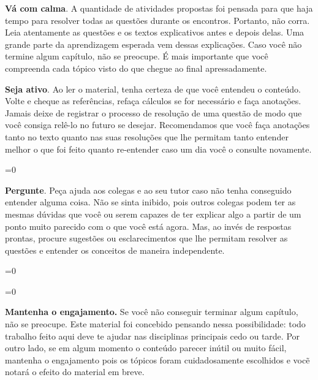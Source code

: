 {%

\textbf{Vá com calma}. A quantidade de atividades propostas foi pensada para que haja tempo para resolver todas as questões durante os encontros. Portanto, não corra. Leia atentamente as questões e os textos explicativos antes e depois delas. Uma grande parte da aprendizagem esperada vem dessas explicações. Caso você não termine algum capítulo, não se preocupe. É mais importante que você compreenda cada tópico visto do que chegue ao final apressadamente.


\paraAmbos
 
 \textbf{Seja ativo}. Ao ler o material, tenha certeza de que você entendeu o conteúdo. Volte e cheque as referências, refaça cálculos se for necessário e faça anotações. Jamais deixe de registrar o processo de resolução de uma questão de modo que você consiga relê-lo no futuro se desejar. Recomendamos que você faça anotações tanto no texto quanto nas suas resoluções que lhe permitam tanto entender  melhor o que foi feito quanto re-entender caso um dia você o consulte novamente. 

\def\mostrarIsso{0}
\ifnum\mostrarIsso=0
%
\fi


\textbf{Pergunte}. Peça ajuda aos colegas e ao seu tutor caso não tenha conseguido entender alguma coisa. Não se sinta inibido, pois outros colegas podem ter as mesmas dúvidas que você ou serem capazes de ter explicar algo a partir de um ponto muito parecido com o que você está agora. Mas, ao invés de respostas prontas, procure sugestões ou esclarecimentos que lhe permitam resolver as questões e entender os conceitos de maneira independente.

\ifnum\mostrarIsso=0
%
\fi


\newcommand{\testeString}{Abacates}
\ifnum\strcmp{\testeString}{Abacaxi}=0
%
\fi

\textbf{Mantenha o engajamento.} Se você não conseguir terminar algum capítulo, não se preocupe. Este material foi concebido pensando nessa possibilidade: todo trabalho feito aqui deve te ajudar nas disciplinas principais cedo ou tarde. Por outro lado, se em algum momento o conteúdo parecer inútil ou muito fácil, mantenha o engajamento pois os tópicos foram cuidadosamente escolhidos e vocẽ notará o efeito do material em breve.

}
